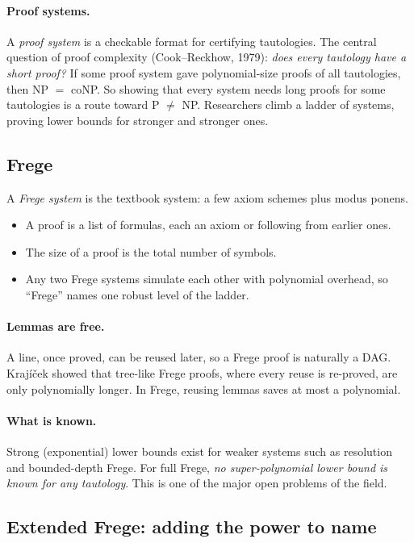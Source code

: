 \documentclass[11pt]{article}
\begin{document}
\paragraph{Proof systems.} A \emph{proof system} is a checkable format for certifying
tautologies. The central question of proof complexity (Cook--Reckhow, 1979): \emph{does
every tautology have a short proof?} If some proof system gave polynomial-size proofs of
all tautologies, then NP $=$ coNP. So showing that every system needs long proofs for some
tautologies is a route toward P $\neq$ NP. Researchers climb a ladder of systems, proving
lower bounds for stronger and stronger ones.

\subsection{Frege}

A \emph{Frege system} is the textbook system: a few axiom schemes plus modus ponens.
\begin{itemize}
\item A proof is a list of formulas, each an axiom or following from earlier ones.
\item The size of a proof is the total number of symbols.
\item Any two Frege systems simulate each other with polynomial overhead, so ``Frege''
  names one robust level of the ladder.
\end{itemize}

\paragraph{Lemmas are free.} A line, once proved, can be reused later, so a Frege proof is
naturally a DAG. Kraj\'i\v{c}ek showed that tree-like Frege proofs, where every reuse is
re-proved, are only polynomially longer. In Frege, reusing lemmas saves at most a
polynomial.

\paragraph{What is known.} Strong (exponential) lower bounds exist for weaker systems such
as resolution and bounded-depth Frege. For full Frege, \emph{no super-polynomial lower
bound is known for any tautology}. This is one of the major open problems of the field.

\subsection{Extended Frege: adding the power to name}
\end{document}
